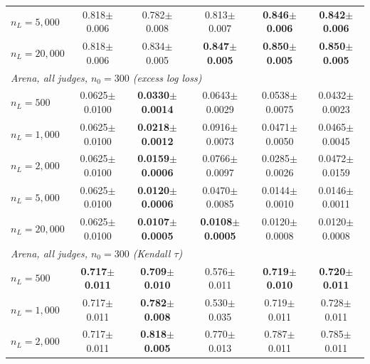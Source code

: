 \begin{table}[!t]
{\begin{tabular}{lccccc}
\quad $n_L=5,000$ & 0.818{\scriptsize$\pm$0.006} & 0.782{\scriptsize$\pm$0.008} & 0.813{\scriptsize$\pm$0.007} & \textbf{0.846{\scriptsize$\pm$0.006}} & \textbf{0.842{\scriptsize$\pm$0.006}} \\
\quad $n_L=20,000$ & 0.818{\scriptsize$\pm$0.006} & 0.834{\scriptsize$\pm$0.005} & \textbf{0.847{\scriptsize$\pm$0.005}} & \textbf{0.850{\scriptsize$\pm$0.005}} & \textbf{0.850{\scriptsize$\pm$0.005}} \\
\midrule
\multicolumn{6}{l}{\emph{Arena, all judges, $n_0=300$ (excess log loss)}} \\
\quad $n_L=500$ & 0.0625{\scriptsize$\pm$0.0100} & \textbf{0.0330{\scriptsize$\pm$0.0014}} & 0.0643{\scriptsize$\pm$0.0029} & 0.0538{\scriptsize$\pm$0.0075} & 0.0432{\scriptsize$\pm$0.0023} \\
\quad $n_L=1,000$ & 0.0625{\scriptsize$\pm$0.0100} & \textbf{0.0218{\scriptsize$\pm$0.0012}} & 0.0916{\scriptsize$\pm$0.0073} & 0.0471{\scriptsize$\pm$0.0050} & 0.0465{\scriptsize$\pm$0.0045} \\
\quad $n_L=2,000$ & 0.0625{\scriptsize$\pm$0.0100} & \textbf{0.0159{\scriptsize$\pm$0.0006}} & 0.0766{\scriptsize$\pm$0.0097} & 0.0285{\scriptsize$\pm$0.0026} & 0.0472{\scriptsize$\pm$0.0159} \\
\quad $n_L=5,000$ & 0.0625{\scriptsize$\pm$0.0100} & \textbf{0.0120{\scriptsize$\pm$0.0006}} & 0.0470{\scriptsize$\pm$0.0085} & 0.0144{\scriptsize$\pm$0.0010} & 0.0146{\scriptsize$\pm$0.0011} \\
\quad $n_L=20,000$ & 0.0625{\scriptsize$\pm$0.0100} & \textbf{0.0107{\scriptsize$\pm$0.0005}} & \textbf{0.0108{\scriptsize$\pm$0.0005}} & 0.0120{\scriptsize$\pm$0.0008} & 0.0120{\scriptsize$\pm$0.0008} \\
\midrule
\multicolumn{6}{l}{\emph{Arena, all judges, $n_0=300$ (Kendall $\tau$)}} \\
\quad $n_L=500$ & \textbf{0.717{\scriptsize$\pm$0.011}} & \textbf{0.709{\scriptsize$\pm$0.010}} & 0.576{\scriptsize$\pm$0.011} & \textbf{0.719{\scriptsize$\pm$0.010}} & \textbf{0.720{\scriptsize$\pm$0.011}} \\
\quad $n_L=1,000$ & 0.717{\scriptsize$\pm$0.011} & \textbf{0.782{\scriptsize$\pm$0.008}} & 0.530{\scriptsize$\pm$0.035} & 0.719{\scriptsize$\pm$0.011} & 0.728{\scriptsize$\pm$0.011} \\
\quad $n_L=2,000$ & 0.717{\scriptsize$\pm$0.011} & \textbf{0.818{\scriptsize$\pm$0.005}} & 0.770{\scriptsize$\pm$0.013} & 0.787{\scriptsize$\pm$0.011} & 0.785{\scriptsize$\pm$0.011} \\

\end{tabular}}
\end{table}
